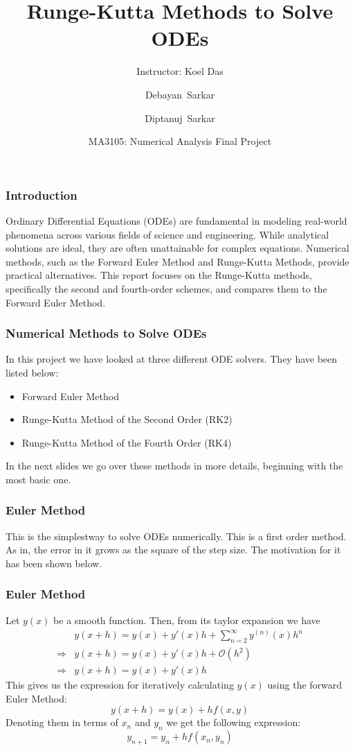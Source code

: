 \documentclass{beamer}
\title[Runge-Kutta Methods to Solve ODEs] %
{Runge-Kutta Methods to Solve ODEs}
\subtitle{Instructor: Koel Das}
\author[Sarkar, Sarkar] %
{Debayan~Sarkar\inst{1} \and Diptanuj~Sarkar\inst{2}}
\institute %
{
  \inst{1}%
  Dept. of Physical Sciences\\
  IISER Kolkata
  \and
  \inst{2}%
  Dept. of Physical Sciences\\
  IISER Kolkata
}
\date[\today] %
{MA3105: Numerical Analysis Final Project}
\begin{document}
\frame{\titlepage}
\begin{frame}
\frametitle{Introduction}
        Ordinary Differential Equations (ODEs) are fundamental in modeling real-world phenomena across various fields of science and engineering. While analytical solutions are ideal, they are often unattainable for complex equations. Numerical methods, such as the Forward Euler Method and Runge-Kutta Methods, provide practical alternatives. This report focuses on the Runge-Kutta methods, specifically the second and fourth-order schemes, and compares them to the Forward Euler Method.
\end{frame}
\begin{frame}
    \frametitle{Numerical Methods to Solve ODEs}
    In this project we have looked at three different ODE solvers. They have been listed below:
    \begin{itemize}
        \item Forward Euler Method
        \item Runge-Kutta Method of the Second Order (RK2)
        \item Runge-Kutta Method of the Fourth Order (RK4)
    \end{itemize}
   In the next slides we go over these methods in more details, beginning with the most basic one. 
\end{frame}
\begin{frame}
    \frametitle{Euler Method}
    This is the simplestway to solve ODEs numerically. This is a first order method. As in, the error in it grows as the square of the step size. The motivation for it has been shown below.

\end{frame}
\begin{frame}
    \frametitle{Euler Method}

    Let $y(x)$ be a smooth function. Then, from its taylor expansion we have
    \begin{align*}
        &y(x + h) = y(x) + y'(x)h + \sum_{n = 2}^{\infty}y^{(n)}(x)h^n \\
        \Rightarrow &y(x + h) = y(x) + y'(x)h + \mathcal{O}(h^2) \\
        \Rightarrow &y(x + h) = y(x) + y'(x)h \tag{Ignoring the second order terms}
    \end{align*}
    This gives us the expression for iteratively calculating $y(x)$ using the forward Euler Method:
    $$y(x + h) = y(x) + hf(x, y)$$
    Denoting them in terms of $x_n$ and $y_n$ we get the following expression:
    $$\boxed{y_{n+1} = y_n + hf(x_n, y_n)}$$
\end{frame}
\end{document}
